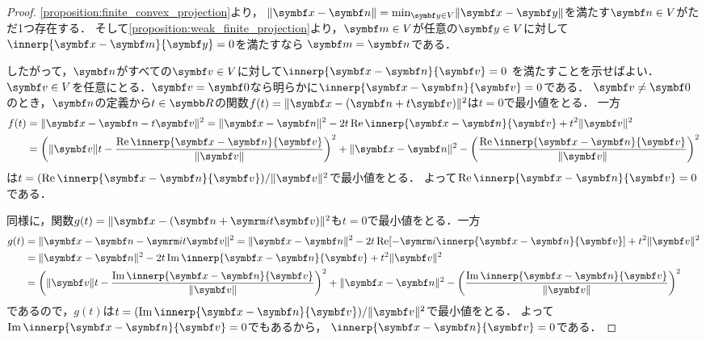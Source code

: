 \documentclass[../../main]{subfiles}
\begin{document}
\begin{proof}
  \cref{proposition:finite_convex_projection}より，
  \(\vnorm{\vect{x}-\vect{n}}=\min_{\vect{y}\in V}\vnorm{\vect{x}-\vect{y}}\)を満たす\(\vect{n}\in V\)がただ1つ存在する．
  そして\cref{proposition:weak_finite_projection}より，\(\vect{m}\in V\)が任意の\(\vect{y}\in V\)に対して\(\innerp{\vect{x}-\vect{m}}{\vect{y}}=0\)を満たすなら
  \(\vect{m}=\vect{n}\)である．

  したがって，\(\vect{n}\)がすべての\(\vect{v}\in V\)に対して\(\innerp{\vect{x}-\vect{n}}{\vect{v}}=0\)
  を満たすことを示せばよい．
  \(\vect{v}\in V\)を任意にとる．\(\vect{v}=\vect{0}\)なら明らかに\(\innerp{\vect{x}-\vect{n}}{\vect{v}}=0\)である．
  \(\vect{v}\neq\vect{0}\)のとき，\(\vect{n}\)の定義から\(t\in\numset{R}\)の関数\(f(t)=\vnorm{\vect{x}-(\vect{n}+t\vect{v})}^2\)は\(t=0\)で最小値をとる．
  一方
  \begin{align*}
    f(t) &= \vnorm{\vect{x}-\vect{n}-t\vect{v}}^2 = \vnorm{\vect{x}-\vect{n}}^2-2t\rpart\innerp{\vect{x}-\vect{n}}{\vect{v}}+t^2\vnorm{\vect{v}}^2 \\
    &= \pqty*{\vnorm{\vect{v}}t-\frac{\rpart\innerp{\vect{x}-\vect{n}}{\vect{v}}}{\vnorm{\vect{v}}}}^2+\vnorm{\vect{x}-\vect{n}}^2-\pqty*{\frac{\rpart\innerp{\vect{x}-\vect{n}}{\vect{v}}}{\vnorm{\vect{v}}}}^2
  \end{align*}
  は\(t=(\rpart\innerp{\vect{x}-\vect{n}}{\vect{v}})/\vnorm{\vect{v}}^2\)で最小値をとる．
  よって\(\rpart\innerp{\vect{x}-\vect{n}}{\vect{v}}=0\)である．

  同様に，関数\(g(t)=\vnorm{\vect{x}-(\vect{n}+\iuni t\vect{v})}^2\)も\(t=0\)で最小値をとる．一方
  \begin{align*}
    g(t) &= \vnorm{\vect{x}-\vect{n}-\iuni t\vect{v}}^2 = \vnorm{\vect{x}-\vect{n}}^2-2t\rpart[-\iuni\innerp{\vect{x}-\vect{n}}{\vect{v}}]+t^2\vnorm{\vect{v}}^2 \\
    &= \vnorm{\vect{x}-\vect{n}}^2-2t\ipart\innerp{\vect{x}-\vect{n}}{\vect{v}}+t^2\vnorm{\vect{v}}^2 \\
    &= \pqty*{\vnorm{\vect{v}}t-\frac{\ipart\innerp{\vect{x}-\vect{n}}{\vect{v}}}{\vnorm{\vect{v}}}}^2+\vnorm{\vect{x}-\vect{n}}^2-\pqty*{\frac{\ipart\innerp{\vect{x}-\vect{n}}{\vect{v}}}{\vnorm{\vect{v}}}}^2
  \end{align*}
  であるので，\(g(t)\)は\(t=(\ipart\innerp{\vect{x}-\vect{n}}{\vect{v}})/\vnorm{\vect{v}}^2\)で最小値をとる．
  よって\(\ipart\innerp{\vect{x}-\vect{n}}{\vect{v}}=0\)でもあるから，
  \(\innerp{\vect{x}-\vect{n}}{\vect{v}}=0\)である．
\end{proof}
\end{document}
